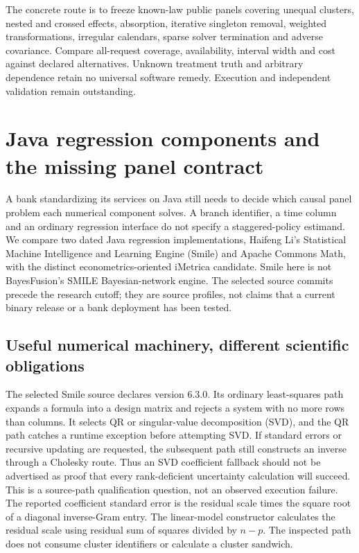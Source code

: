 The concrete route is to freeze known-law public panels covering unequal
clusters, nested and crossed effects, absorption, iterative singleton
removal, weighted transformations, irregular calendars, sparse solver
termination and adverse covariance. Compare all-request coverage,
availability, interval width and cost against declared alternatives.
Unknown treatment truth and arbitrary dependence retain no universal
software remedy. Execution and independent validation remain outstanding.
\citep{exec24_lmpanel_reference}



\section{Java regression components and the missing panel contract}
\label{sec:exec25-panels-java}
A bank standardizing its services on Java still needs to decide which causal
panel problem each numerical component solves. A branch identifier, a time
column and an ordinary regression interface do not specify a staggered-policy
estimand. We compare two dated Java regression implementations, Haifeng Li's
Statistical Machine Intelligence and Learning Engine (Smile) and Apache
Commons Math, with the distinct econometrics-oriented iMetrica candidate.
Smile here is not BayesFusion's SMILE Bayesian-network engine. The selected
source commits precede the research cutoff; they are source profiles, not
claims that a current binary release or a bank deployment has been tested.
\citep{exec25_paneljava_smile,exec25_paneljava_commons,exec25_paneljava_imetrica}

\subsection{Useful numerical machinery, different scientific obligations}
The selected Smile source declares version 6.3.0. Its ordinary least-squares
path expands a formula into a design matrix and rejects a system with no more
rows than columns. It selects QR or singular-value decomposition (SVD), and
the QR path catches a runtime exception before attempting SVD. If standard
errors or recursive updating are requested, the subsequent path still constructs
an inverse through a Cholesky route. Thus an SVD coefficient fallback should
not be advertised as proof that every rank-deficient uncertainty calculation
will succeed. This is a source-path qualification question, not an observed
execution failure. The reported coefficient standard error is the residual
scale times the square root of a diagonal inverse-Gram entry. The linear-model
constructor calculates the residual scale using residual sum of squares divided
by $n-p$. The inspected path does not consume cluster identifiers or calculate
a cluster sandwich.~\citep{exec25_paneljava_smile}

